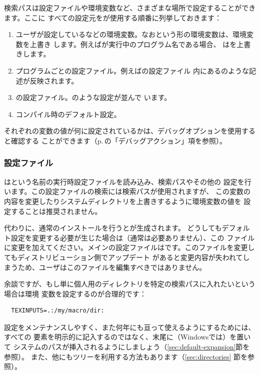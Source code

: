 \documentclass[uplatex,dvipdfmx,12pt,tombow]{jsarticle}
\begin{document}
検索パスは設定ファイルや環境変数など、さまざまな場所で設定することができます。ここに
すべての設定元を\KPS が使用する順番に列挙しておきます：
%
\begin{enumerate}
\item ユーザが設定しているなどの環境変数。なおという形の環境変数は、環境変数を上書き
  します。例えばが実行中のプログラム名である場合、%
  はを上書きします。
\item プログラムごとの設定ファイル。例えばの設定ファイル%
  内にあるのような記述が反映されます。
\item \KPS の設定ファイル。のような設定が並んで
  います。
\item コンパイル時のデフォルト設定。
\end{enumerate}
%
それぞれの変数の値が何に設定されているかは、デバッグオプションを使用すると確認する
ことができます（p.\,\pageref{sec:debugging}の「デバッグアクション」項を参照）。

\subsubsection{設定ファイル}
\label{sec:configfiles}

\KPS はという名前の実行時設定ファイルを読み込み、検索パスやその他の
設定を行います。この設定ファイルの検索には検索パスが使用されますが、
この変数の内容を変更したりシステムディレクトリを上書きするように環境変数の値を
設定することは推奨されません。

代わりに、通常のインストールを行うとが生成されます。
どうしてもデフォルト設定を変更する必要が生じた場合は（通常は必要ありません）、この
ファイルに変更を加えてください。メインの設定ファイルはです。このファイルを変更してもディストリビューション側でアップデート
があると変更内容が失われてしまうため、ユーザはこのファイルを編集すべきではありません。

余談ですが、もし単に個人用のディレクトリを特定の検索パスに入れたいという場合は環境
変数を設定するのが合理的です：
%
\begin{verbatim}
  TEXINPUTS=.:/my/macro/dir:
\end{verbatim}
%
設定をメンテナンスしやすく、また何年にも亘って使えるようにするためには、すべての
要素を明示的に記入するのではなく、末尾に\samp{:}（Windowsでは\samp{;}）を置いて
システムのパスが挿入されるようにしましょう（\ref{sec:default-expansion}節を参照）。
また、他にもツリーを利用する方法もあります（\ref{sec:directories}%
節を参照）。
\end{document}
